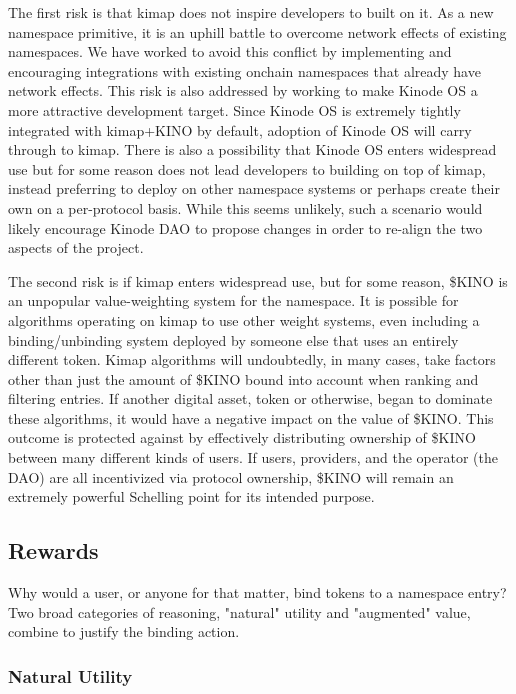 \documentclass[runningheads]{llncs}
\begin{document}
The first risk is that kimap does not inspire developers to built on it.
As a new namespace primitive, it is an uphill battle to overcome network effects of existing namespaces.
We have worked to avoid this conflict by implementing and encouraging integrations with existing onchain namespaces that already have network effects.
This risk is also addressed by working to make Kinode OS a more attractive development target.
Since Kinode OS is extremely tightly integrated with kimap+KINO by default, adoption of Kinode OS will carry through to kimap.
There is also a possibility that Kinode OS enters widespread use but for some reason does not lead developers to building on top of kimap, instead preferring to deploy on other namespace systems or perhaps create their own on a per-protocol basis.
While this seems unlikely, such a scenario would likely encourage Kinode DAO to propose changes in order to re-align the two aspects of the project.

The second risk is if kimap enters widespread use, but for some reason, \$KINO is an unpopular value-weighting system for the namespace.
It is possible for algorithms operating on kimap to use other weight systems, even including a binding/unbinding system deployed by someone else that uses an entirely different token.
Kimap algorithms will undoubtedly, in many cases, take factors other than just the amount of \$KINO bound into account when ranking and filtering entries.
If another digital asset, token or otherwise, began to dominate these algorithms, it would have a negative impact on the value of \$KINO.
This outcome is protected against by effectively distributing ownership of \$KINO between many different kinds of users.
If users, providers, and the operator (the DAO) are all incentivized via protocol ownership, \$KINO will remain an extremely powerful Schelling point for its intended purpose.

\subsection{Rewards}

Why would a user, or anyone for that matter, bind tokens to a namespace entry?
Two broad categories of reasoning, "natural" utility and "augmented" value, combine to justify the binding action.

\subsubsection{Natural Utility}
\end{document}
